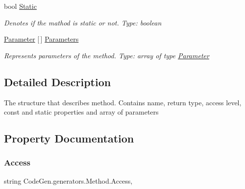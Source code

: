 \begin{DoxyCompactItemize}
bool \mbox{\hyperlink{classCodeGen_1_1generators_1_1Method_a40aa2b9a7000ae6acc851b97410ce2af}{Static}}
\begin{DoxyCompactList}\small\item\em Denotes if the mathod is static or not. Type\+: boolean \end{DoxyCompactList}\item 
\mbox{\hyperlink{classCodeGen_1_1generators_1_1Parameter}{Parameter}} \mbox{[}$\,$\mbox{]} \mbox{\hyperlink{classCodeGen_1_1generators_1_1Method_ae6898cecae4a670b5e72568bce89fea3}{Parameters}}
\begin{DoxyCompactList}\small\item\em Represents parameters of the method. Type\+: array of type \mbox{\hyperlink{classCodeGen_1_1generators_1_1Parameter}{Parameter}} \end{DoxyCompactList}\end{DoxyCompactItemize}


\subsection{Detailed Description}
The structure that describes method. Contains name, return type, access level, const and static properties and array of parameters 



\subsection{Property Documentation}
\mbox{\label{classCodeGen_1_1generators_1_1Method_ad713380461315774e85e7316f9a48df9}} 
\subsubsection{\texorpdfstring{Access}{Access}}
{\footnotesize\ttfamily string Code\+Gen.\+generators.\+Method.\+Access\hspace{0.3cm}{\ttfamily [get]}, {\ttfamily [set]}}



